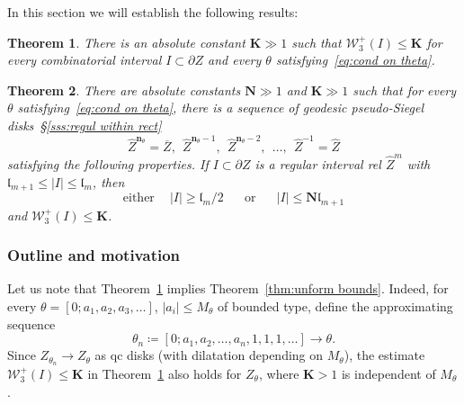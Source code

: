 \documentclass{amsart}
\renewcommand{\sp}{{\ \ }}
\newcommand{\1}{{\mathbb 1 }}
\newcommand{\Width}{{\mathcal W}}
\newcommand{\bN}{{\mathbf N}}
\newcommand{\wZ}{{\widehat Z}}
\newcommand{\bK}{{\mathbf K}}
\newcommand{\bbn}{{\mathbf n}}
\newcommand{\length}{{\mathfrak l}}
\newtheorem{thm}{Theorem}[section]
\theoremstyle{remark}
\numberwithin{equation}{section}
\theoremstyle{definition}
\begin{document}
In this section we will establish the following results:


\begin{thm}
\label{mainthm:v1}
There is an absolute constant $\bK\gg 1$ such that $\Width^+_3(I)\le \bK$ for every combinatorial interval $I\subset \partial Z$ and every $\theta$ satisfying~\eqref{eq:cond on theta}. 
\end{thm}



\begin{thm}
\label{mainthm:v2}
There are absolute constants $\bN\gg 1$ and $\bK\gg 1$ such that for every $\theta$ satisfying~\eqref{eq:cond on theta}, there is a sequence of geodesic pseudo-Siegel disks~\S\ref{sss:regul within rect}
\[  \wZ^{\bbn_\theta} =\overline Z,\sp  \wZ^{\bbn_\theta-1} , \sp \wZ^{\bbn_\theta-2},\sp \dots, \sp \wZ^{-1}=\wZ \]
satisfying the following properties. If $I\subset \partial Z$ is a regular interval rel $\wZ^m$ with  $\length_{m+1}\le|I|\le\length_{m}$, then 
\begin{equation}
\label{eq:mainthm:v2}
 \text{either }\sp\sp |I|\ge \length_{m}/2\sp\sp\sp\text{ or }\sp\sp\sp |I|\le \bN \length_{m+1}
\end{equation}
and $\Width^{+}_3(I)\le \bK$.  
\end{thm}




 

\subsubsection{Outline and motivation}\label{sss:outline prd of main res} Let us note that Theorem~\ref{mainthm:v1} implies Theorem~\ref{thm:unform bounds}. Indeed, for every $\theta=[0;a_1,a_2,a_3, \dots]$, $|a_i|\le M_\theta$ of bounded type, define the approximating sequence
\[\theta_{n}\coloneqq [0;a_1,a_2,\dots, a_n,1,1,1,\dots]\to \theta.\]
Since $Z_{\theta_n}\to Z_{\theta}$ as qc disks (with dilatation depending on $M_\theta$), the estimate $\Width^+_3(I)\le \bK$ in Theorem~\ref{mainthm:v1} also holds for $Z_\theta$, where $\bK>1$ is independent of $M_\theta$.
\end{document}
